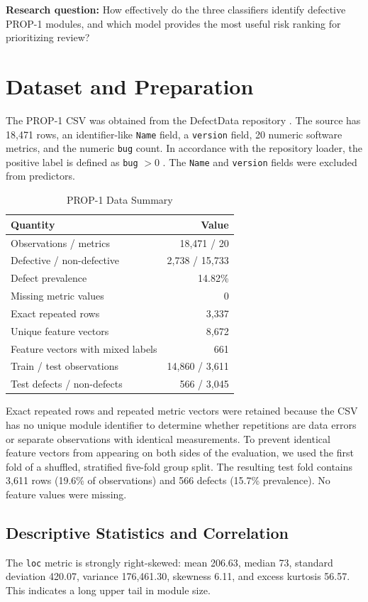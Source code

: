 \documentclass[conference]{IEEEtran}
\begin{document}
\textbf{Research question:} How effectively do the three classifiers identify defective PROP-1 modules, and which model provides the most useful risk ranking for prioritizing review?

\section{Dataset and Preparation}
The PROP-1 CSV was obtained from the DefectData repository \cite{defectdata,loader}. The source has 18,471 rows, an identifier-like \texttt{Name} field, a \texttt{version} field, 20 numeric software metrics, and the numeric \texttt{bug} count. In accordance with the repository loader, the positive label is defined as \texttt{bug} $>0$ \cite{loader}. The \texttt{Name} and \texttt{version} fields were excluded from predictors.

\begin{table}[t]
\caption{PROP-1 Data Summary}
\label{tab:data}
\centering
\footnotesize
\begin{tabular}{lr}
\toprule
\textbf{Quantity} & \textbf{Value}\\
\midrule
Observations / metrics & 18,471 / 20\\
Defective / non-defective & 2,738 / 15,733\\
Defect prevalence & 14.82\%\\
Missing metric values & 0\\
Exact repeated rows & 3,337\\
Unique feature vectors & 8,672\\
Feature vectors with mixed labels & 661\\
Train / test observations & 14,860 / 3,611\\
Test defects / non-defects & 566 / 3,045\\
\bottomrule
\end{tabular}
\end{table}

Exact repeated rows and repeated metric vectors were retained because the CSV has no unique module identifier to determine whether repetitions are data errors or separate observations with identical measurements. To prevent identical feature vectors from appearing on both sides of the evaluation, we used the first fold of a shuffled, stratified five-fold group split. The resulting test fold contains 3,611 rows (19.6\% of observations) and 566 defects (15.7\% prevalence). No feature values were missing.

\subsection{Descriptive Statistics and Correlation}
The \texttt{loc} metric is strongly right-skewed: mean 206.63, median 73, standard deviation 420.07, variance 176,461.30, skewness 6.11, and excess kurtosis 56.57. This indicates a long upper tail in module size.
\end{document}

